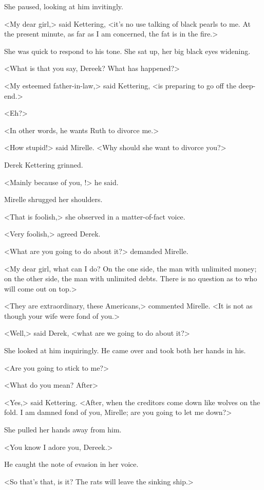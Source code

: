 She paused, looking at him invitingly.

<My dear girl,> said Kettering, <it's no use talking of black pearls to me. At the present minute, as far as I am concerned, the fat is in the fire.>

She was quick to respond to his tone. She sat up, her big black eyes widening.

<What is that you say, Dereek? What has happened?>

<My esteemed father-in-law,> said Kettering, <is preparing to go off the deep-end.>

<Eh?>

<In other words, he wants Ruth to divorce me.>

<How stupid!> said Mirelle. <Why should she want to divorce you?>

Derek Kettering grinned.

<Mainly because of you, !> he said.

Mirelle shrugged her shoulders.

<That is foolish,> she observed in a matter-of-fact voice.

<Very foolish,> agreed Derek.

<What are you going to do about it?> demanded Mirelle.

<My dear girl, what can I do? On the one side, the man with unlimited money; on the other side, the man with unlimited debts. There is no question as to who will come out on top.>

<They are extraordinary, these Americans,> commented Mirelle. <It is not as though your wife were fond of you.>

<Well,> said Derek, <what are we going to do about it?>

She looked at him inquiringly. He came over and took both her hands in his.

<Are you going to stick to me?>

<What do you mean? After\longdash>

<Yes,> said Kettering. <After, when the creditors come down like wolves on the fold. I am damned fond of you, Mirelle; are you going to let me down?>

She pulled her hands away from him.

<You know I adore you, Dereek.>

He caught the note of evasion in her voice.

<So that's that, is it? The rats will leave the sinking ship.>

